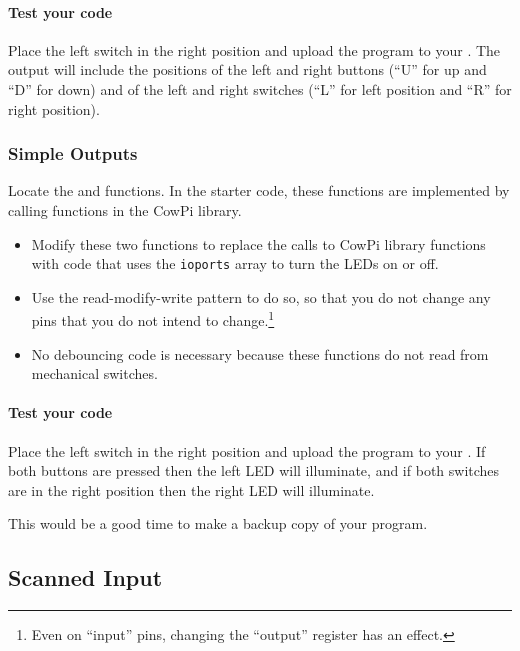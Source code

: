 \paragraph{Test your code}

Place the left switch in the right position and upload the program to your \developmentboard.
The output will include the positions of the left and right buttons (``U'' for up and ``D'' for down) and of the left and right switches (``L'' for left position and ``R'' for right position).


\subsubsection{Simple Outputs}

Locate the  and  functions.
In the starter code, these functions are implemented by calling functions in the CowPi library.

\begin{itemize}
    \item Modify these two functions to replace the calls to CowPi library functions with code that uses the \lstinline{ioports} array to turn the LEDs on or off.
    \item Use the read-modify-write pattern to do so, so that you do not change any pins that you do not intend to change.\footnote{Even on ``input'' pins, changing the ``output'' register has an effect.}
    \item No debouncing code is necessary because these functions do not read from mechanical switches.
\end{itemize}

\paragraph{Test your code}

Place the left switch in the right position and upload the program to your \developmentboard.
If both buttons are pressed then the left LED will illuminate, and if both switches are in the right position then the right LED will illuminate.

\vspace{1cm}

This would be a good time to make a backup copy of your program.


\subsection{Scanned Input} \label{subsec:ScannedInput}

